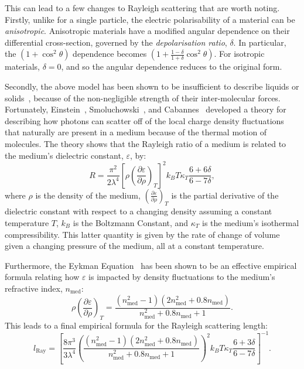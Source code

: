 This can lead to a few changes to Rayleigh scattering that are worth noting. Firstly, unlike for a single particle, the electric polarisability of a material can be \textit{anisotropic}. Anisotropic materials have a modified angular dependence on their differential cross-section, governed by the \textit{depolarisation ratio}, $\delta$. In particular, the $\left(1+\cos^{2}\theta\right)$ dependence becomes $\left(1+\frac{1-\delta}{1+\delta}\cos^{2}\theta\right)$. For isotropic materials, $\delta=0$, and so the angular dependence reduces to the original form.

Secondly, the above model has been shown to be insufficient to describe liquids or solids~\cite{JerlovNilsGunnar1974Oaoo}, %
because of the non-negligible strength of their inter-molecular forces. Fortunately, Einstein~\cite{einsteinTheoryOpalescenceHomogeneous1910}, %
Smoluchowski~\cite{smoluchowskiMolecularKineticTheory1908}, %
and Cabannes~\cite{cabannesRelationshipDegreePolarisation1920} %
developed a theory for describing how photons can scatter off of the local charge density fluctuations that naturally are present in a medium because of the thermal motion of molecules. The theory shows that the Rayleigh ratio of a medium is related to the medium's dielectric constant, $\varepsilon$, by:
\begin{equation}
    R = \frac{\pi^{2}}{2\lambda^{4}}\left[\rho\left(\frac{\partial\varepsilon}{\partial\rho}\right)_{T}\right]^{2} k_{B}T \kappa_{T}\frac{6+6\delta}{6-7\delta},
\end{equation}
where $\rho$ is the density of the medium, $\left(\frac{\partial\varepsilon}{\partial\rho}\right)_{T}$ is the partial derivative of the dielectric constant with respect to a changing density assuming a constant temperature $T$, $k_{B}$ is the Boltzmann Constant, and $\kappa_{T}$ is the medium's isothermal compressibility. This latter quantity is given by the rate of change of volume given a changing pressure of the medium, all at a constant temperature.

Furthermore, the Eykman Equation~\cite{eykmanRecherchesRefractometriquesSuite1895,zhouRayleighScatteringLinear2015} %
has been shown to be an effective empirical formula relating how $\varepsilon$ is impacted by density fluctuations to the medium's refractive index, $n_{\textrm{med}}$:
\begin{equation}
    \rho\left(\frac{\partial\varepsilon}{\partial\rho}\right)_{T} = 
    \frac{\left(n_{\textrm{med}}^{2}-1\right)\left(2n_{\textrm{med}}^{2}+0.8n_{\textrm{med}}\right)}{n_{\textrm{med}}^{2}+0.8n_{\textrm{med}}+1}.
\end{equation}
This leads to a final empirical formula for the Rayleigh scattering length:
\begin{equation}
    l_{\mathrm{Ray}} = \left[
        \frac{8\pi^{3}}{3\lambda^{4}}
        \left(
            \frac{\left(n_{\textrm{med}}^{2}-1\right)\left(2n_{\textrm{med}}^{2}+0.8n_{\textrm{med}}\right)}{n_{\textrm{med}}^{2}+0.8n_{\textrm{med}}+1}
        \right)^2
        k_{B}T \kappa_{T}\frac{6+3\delta}{6-7\delta}
        \right]^{-1}.
\end{equation}

